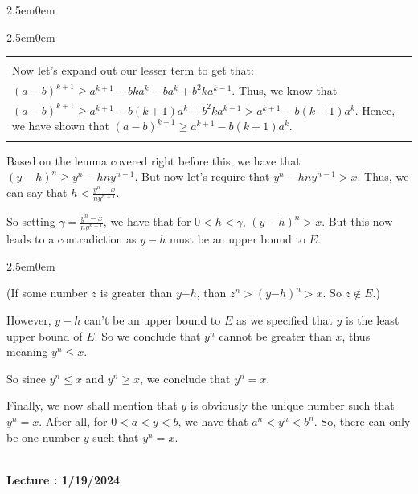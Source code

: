 \documentclass{book}
\newcommand{\hFour}{%
   \color{Cerulean}
   \fontsize{12}{14}\selectfont%
}
\newenvironment{myIndent}{%
   \begin{adjustwidth}{2.5em}{0em}%
}{%
   \end{adjustwidth}%
}
\newcommand{\retTwo}{\hfill\bigbreak}
\newcounter{LectureNumber}
\newcommand*{\markLecture}[1]{%
   \stepcounter{LectureNumber}%
   {\huge \color{Black} \textbf{Lecture \theLectureNumber: #1} \newline}%
}
\newcommand{\mySepTwo}[1][.]{%
   {\noindent\color{#1}{\rule{6.5in}{0.5mm}}}\\%
}
\newenvironment{myClosureOneDeprecated}[2][.]{%
   \color{#1}%
   \begin{tabular}{|p{#2in}|} \hline \\%
}{%
   \\ \\ \hline \end{tabular}%
}
\begin{document}
{\begin{myIndent}
{\begin{myIndent}
{\begin{center}
\begin{myClosureOneDeprecated}{5}
               Now let's expand out our lesser term to get that: \\ $(a-b)^{k+1} \geq a^{k+1}-bka^k - ba^k + b^2ka^{k-1}$. Thus, we know that \\$(a-b)^{k+1} \geq a^{k+1}-b(k+1)a^k + b^2ka^{k-1} > a^{k+1}-b(k+1)a^k$. Hence, we have shown that $(a-b)^{k+1} \geq a^{k+1}-b(k+1)a^k$.
            \end{myClosureOneDeprecated}
         \end{center}}
         \newpage

         Based on the lemma covered right before this, we have that \\$(y-h)^n \geq y^n-hny^{n-1}$. But now let's require that $y^n-hny^{n-1}>x$. Thus, we can say that $h<\frac{y^n-x}{ny^{n-1}}$. \retTwo

         So setting $\gamma = \frac{y^n-x}{ny^{n-1}}$, we have that for $0 < h < \gamma$, \hspace{0.25em} $(y-h)^n > x$. But this now leads to a contradiction as $y-h$ must be an upper bound to $E$.
         {\begin{myIndent} \hFour
            (If some number $z$ is greater than $y{-h}$, than $z^n > (y{-h})^n > x$. So $z \notin E$.) \newline
         \end{myIndent}}
         However, $y-h$ can't be an upper bound to $E$ as we specified that $y$ is the least upper bound of $E$. So we conclude that $y^n$ cannot be greater than $x$, thus meaning $y^n \leq x$.
      \end{myIndent}}

      So since $y^n \leq x$ and $y^n \geq x$, we conclude that $y^n = x$.
      \retTwo

      Finally, we now shall mention that $y$ is obviously the unique number such that \\$y^n=x$. After all, for $0<a<y<b$, we have that $a^n < y^n < b^n$. So, there can only be one number $y$ such that $y^n=x$.
   \end{myIndent}}

   \mySepTwo \newline
   \markLecture{1/19/2024}
\end{document}
